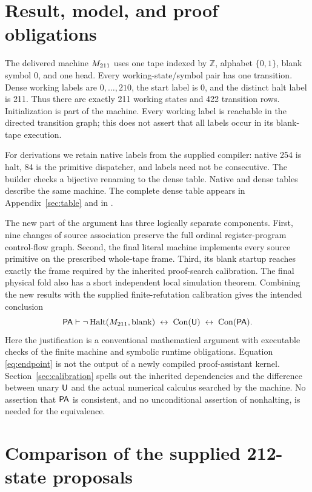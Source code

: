 \section{Result, model, and proof obligations}
\label{sec:result}

The delivered machine $M_{211}$ uses one tape indexed by $\mathbb Z$, alphabet
$\{0,1\}$, blank symbol 0, and one head. Every working-state/symbol pair has
one transition. Dense working labels are $0,\ldots,210$, the start label is
0, and the distinct halt label is 211. Thus there are exactly 211 working
states and 422 transition rows. Initialization is part of the machine.
Every working label is reachable in the directed transition graph; this
does not assert that all labels occur in its blank-tape execution.

For derivations we retain native labels from the supplied compiler:
native 254 is halt, 84 is the primitive dispatcher, and labels need not
be consecutive. The builder checks a bijective renaming to the dense table.
Native and dense tables describe the same machine. The complete dense table
appears in Appendix~\ref{sec:table} and in .

The new part of the argument has three logically separate components.
First, nine changes of source association preserve the full ordinal
register-program control-flow graph. Second, the final literal machine
implements every source primitive on the prescribed whole-tape frame.
Third, its blank startup reaches exactly the frame required by the inherited
proof-search calibration. The final physical fold also has a short independent
local simulation theorem. Combining the new results with the supplied
finite-refutation calibration gives the intended conclusion
\begin{equation}\label{eq:endpoint}
 \mathsf{PA}\vdash
 \neg\operatorname{Halt}(M_{211},\mathrm{blank})
 \;\leftrightarrow\;\operatorname{Con}(\mathsf U)
 \;\leftrightarrow\;\operatorname{Con}(\mathsf{PA}).
\end{equation}
Here the justification is a conventional mathematical argument with executable
checks of the finite machine and symbolic runtime obligations. Equation
\eqref{eq:endpoint} is not the output of a newly compiled proof-assistant
kernel. Section~\ref{sec:calibration} spells out the inherited dependencies
and the difference between unary $\mathsf U$ and the actual numerical calculus
searched by the machine. No assertion that $\mathsf{PA}$ is consistent, and no
unconditional assertion of nonhalting, is needed for the equivalence.

\section{Comparison of the supplied 212-state proposals}
\label{sec:comparison}

